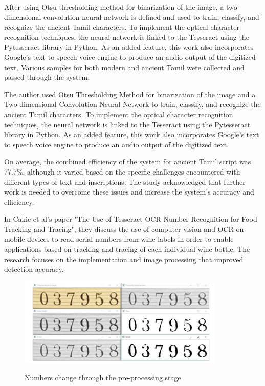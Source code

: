 After using Otsu thresholding method for binarization of the image, a two-dimensional convolution neural network is defined and used to train, classify, and recognize the ancient Tamil characters. To implement the optical character recognition techniques, the neural network is linked to the Tesseract using the Pytesseract library in Python. As an added feature, this work also incorporates Google's text to speech voice engine to produce an audio output of the digitized text. Various samples for both modern and ancient Tamil were collected and passed through the system.


The author used Otsu Thresholding Method for binarization of the image and a Two-dimensional Convolution Neural Network to train, classify, and recognize the ancient Tamil characters. To implement the optical character recognition techniques, the neural network is linked to the Tesseract using the Pytesseract library in Python. As an added feature, this work also incorporates Google's text to speech voice engine to produce an audio output of the digitized text.

On average, the combined efficiency of the system for ancient Tamil script was 77.7\%, although it varied based on the specific challenges encountered with different types of text and inscriptions. The study acknowledged that further work is needed to overcome these issues and increase the system's accuracy and efficiency.\cite{giridharNovelApproachOCR2019}

In Cakic et al's paper "The Use of Tesseract OCR Number Recognition for Food Tracking and Tracing", they discuss the use of computer vision and OCR on mobile devices to read serial numbers from wine labels in order to enable applications based on tracking and tracing of each individual wine bottle. The research focuses on the implementation and image processing that improved detection accuracy.

\begin{figure}[ht]
    \centering
    \includegraphics[width=0.88\textwidth]{Figures/tesseract_papers/Cakic_2020.jpg}
    \caption[Numbers change through the pre-processing stage]{Numbers change through the pre-processing stage}\cite{cakicUseTesseractOCR2020}
    \label{fig:Cakic's Numbers change through the preprocessing stage}
\end{figure}

